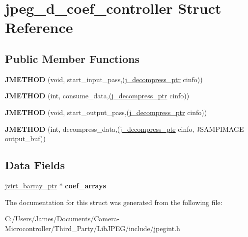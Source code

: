 \hypertarget{structjpeg__d__coef__controller}{}\section{jpeg\+\_\+d\+\_\+coef\+\_\+controller Struct Reference}
\label{structjpeg__d__coef__controller}
\subsection*{Public Member Functions}
\begin{DoxyCompactItemize}
\item 
\mbox{\label{structjpeg__d__coef__controller_a0dac168019b77859a6196eeaad33f240}} 
{\bfseries J\+M\+E\+T\+H\+OD} (void, start\+\_\+input\+\_\+pass,(\hyperlink{structjpeg__decompress__struct}{j\+\_\+decompress\+\_\+ptr} cinfo))
\item 
\mbox{\label{structjpeg__d__coef__controller_a4d55ac9a1890167378bcff6ed7ee986d}} 
{\bfseries J\+M\+E\+T\+H\+OD} (int, consume\+\_\+data,(\hyperlink{structjpeg__decompress__struct}{j\+\_\+decompress\+\_\+ptr} cinfo))
\item 
\mbox{\label{structjpeg__d__coef__controller_a7e3f8f4900b73544b482e05389f55d04}} 
{\bfseries J\+M\+E\+T\+H\+OD} (void, start\+\_\+output\+\_\+pass,(\hyperlink{structjpeg__decompress__struct}{j\+\_\+decompress\+\_\+ptr} cinfo))
\item 
\mbox{\label{structjpeg__d__coef__controller_a2f352a0c53866b20413a2dbbc5160342}} 
{\bfseries J\+M\+E\+T\+H\+OD} (int, decompress\+\_\+data,(\hyperlink{structjpeg__decompress__struct}{j\+\_\+decompress\+\_\+ptr} cinfo, J\+S\+A\+M\+P\+I\+M\+A\+GE output\+\_\+buf))
\end{DoxyCompactItemize}
\subsection*{Data Fields}
\begin{DoxyCompactItemize}
\item 
\mbox{\label{structjpeg__d__coef__controller_ae1a27a4c6e509a29fd9c75cc5cd8002c}} 
\hyperlink{structjvirt__barray__control}{jvirt\+\_\+barray\+\_\+ptr} $\ast$ {\bfseries coef\+\_\+arrays}
\end{DoxyCompactItemize}


The documentation for this struct was generated from the following file\+:\begin{DoxyCompactItemize}
\item 
C\+:/\+Users/\+James/\+Documents/\+Camera-\/\+Microcontroller/\+Third\+\_\+\+Party/\+Lib\+J\+P\+E\+G/include/jpegint.\+h\end{DoxyCompactItemize}
